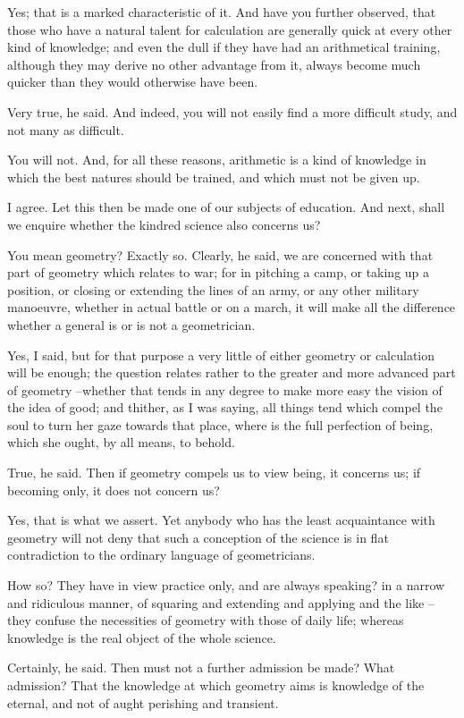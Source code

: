 Yes; that is a marked characteristic of it.
And have you further observed, that those who have a natural talent for calculation are generally quick at every other kind of knowledge; and even the dull if they have had an arithmetical training, although they may derive no other advantage from it, always become much quicker than they would otherwise have been.

Very true, he said.
And indeed, you will not easily find a more difficult study, and not many as difficult.

You will not.
And, for all these reasons, arithmetic is a kind of knowledge in which the best natures should be trained, and which must not be given up.

I agree.
Let this then be made one of our subjects of education. And next, shall we enquire whether the kindred science also concerns us?

You mean geometry?
Exactly so.
Clearly, he said, we are concerned with that part of geometry which relates to war; for in pitching a camp, or taking up a position, or closing or extending the lines of an army, or any other military manoeuvre, whether in actual battle or on a march, it will make all the difference whether a general is or is not a geometrician.

Yes, I said, but for that purpose a very little of either geometry or calculation will be enough; the question relates rather to the greater and more advanced part of geometry --whether that tends in any degree to make more easy the vision of the idea of good; and thither, as I was saying, all things tend which compel the soul to turn her gaze towards that place, where is the full perfection of being, which she ought, by all means, to behold.

True, he said.
Then if geometry compels us to view being, it concerns us; if becoming only, it does not concern us?

Yes, that is what we assert.
Yet anybody who has the least acquaintance with geometry will not deny that such a conception of the science is in flat contradiction to the ordinary language of geometricians.

How so?
They have in view practice only, and are always speaking? in a narrow and ridiculous manner, of squaring and extending and applying and the like --they confuse the necessities of geometry with those of daily life; whereas knowledge is the real object of the whole science.

Certainly, he said.
Then must not a further admission be made?
What admission?
That the knowledge at which geometry aims is knowledge of the eternal, and not of aught perishing and transient.

